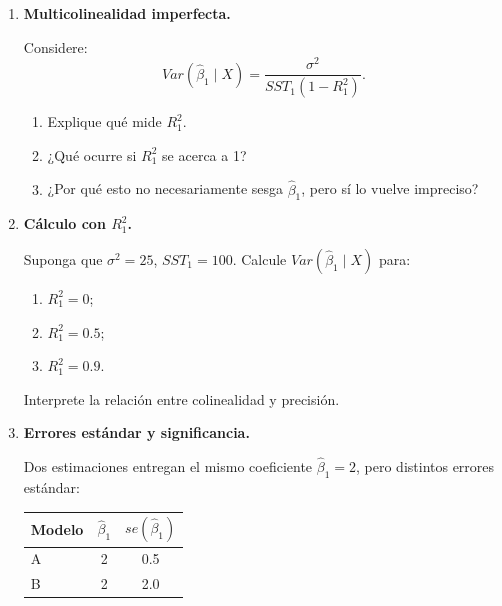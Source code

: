 \documentclass[11pt]{article}
\begin{document}
\begin{enumerate}[label=\textbf{Ejercicio \arabic*.}, leftmargin=*]
\begin{enumerate}[label=\alph*)]
    \item aumenta el tamaño muestral;
    \item aumenta el ruido no explicado en \(y\);
    \item \(x_1\) casi no varía en la muestra;
    \item \(x_1\) está muy correlacionada con otros regresores.
\end{enumerate}

\item \textbf{Multicolinealidad imperfecta.}

Considere:
\[
Var(\hat{\beta}_1\mid X)=\frac{\sigma^2}{SST_1(1-R_1^2)}.
\]

\begin{enumerate}[label=\alph*)]
    \item Explique qué mide \(R_1^2\).
    \item ¿Qué ocurre si \(R_1^2\) se acerca a 1?
    \item ¿Por qué esto no necesariamente sesga \(\hat{\beta}_1\), pero sí lo vuelve impreciso?
\end{enumerate}

\item \textbf{Cálculo con \(R_1^2\).}

Suponga que \(\sigma^2=25\), \(SST_1=100\). Calcule \(Var(\hat{\beta}_1\mid X)\) para:

\begin{enumerate}[label=\alph*)]
    \item \(R_1^2=0\);
    \item \(R_1^2=0.5\);
    \item \(R_1^2=0.9\).
\end{enumerate}

Interprete la relación entre colinealidad y precisión.

\item \textbf{Errores estándar y significancia.}

Dos estimaciones entregan el mismo coeficiente \(\hat{\beta}_1=2\), pero distintos errores estándar:

\begin{center}
\begin{tabular}{lcc}
\toprule
Modelo & \(\hat{\beta}_1\) & \(se(\hat{\beta}_1)\) \\
\midrule
A & 2 & 0.5 \\
B & 2 & 2.0 \\
\bottomrule
\end{tabular}
\end{center}


\end{enumerate}
\end{document}
